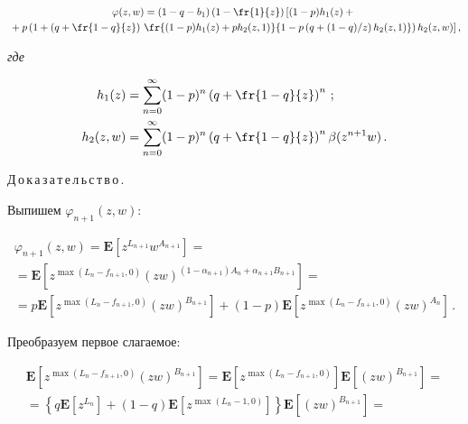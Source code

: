 \begin{multline*}

\varphi(z,w)=(1-q-b_1)\left(1-\fr{1}{z}\right)

\left[\vphantom{\fr{(1-p)h_1(z)+ph_2(z,1)}{1-p\left(q+(1-q)/z\right)h_2(z,1)}}

(1-p)h_1(z)+{}\right.\\

\left.{}+p\left(

1+\left(q+\fr{1-q}{z}\right)\,

\fr{(1-p)h_1(z)+ph_2(z,1)}{1-p\left(q+(1-q)/z\right)h_2(z,1)}\right)h_2(z,w)\right],

\end{multline*}

\textit{где}

\begin{align*}

h_1(z)&=\sum\limits_{n=0}^{\infty}(1-p)^n\left(q+\fr{1-q}{z}\right)^n\,;\\

h_2(z,w)&=\sum\limits_{n=0}^{\infty}(1-p)^n\left(q+\fr{1-q}{z}\right)^n\beta(z^{n+1}w)\,.

\end{align*}



\noindent

Д\,о\,к\,а\,з\,а\,т\,е\,л\,ь\,с\,т\,в\,о\,.\ \

Выпишем $\varphi_{n+1}(z,w)$:

\begin{multline*}

\varphi_{n+1}(z,w)=\mathbf{E}\left[z^{L_{n+1}}w^{A_{n+1}}\right]={}\\

{}=\mathbf{E}\left[z^{\max(L_n-f_{n+1},0)}(zw)^{(1-\alpha_{n+1})A_n+\alpha_{n+1}B_{n+1}}\right]={}\\

=p\mathbf{E}\left[z^{\max(L_n-f_{n+1},0)}(zw)^{B_{n+1}}\right]+(1-p)\mathbf{E}\left[z^{\max(L_n-f_{n+1},0)}(zw)^{A_n}\right]\,.

\end{multline*}

Преобразуем первое слагаемое:

\begin{multline*}

\mathbf{E}\left[

z^{\max(L_n-f_{n+1},0)}(zw)^{B_{n+1}}\right]=

\mathbf{E}\left[z^{\max(L_n-f_{n+1},0)}\right]\mathbf{E}\left[(zw)^{B_{n+1}}\right]={}\\

{}=\left\{q\mathbf{E}\left[z^{L_n}\right]+(1-q)\mathbf{E}\left[z^{\max(L_n-1,0)}\right]

\right\}\mathbf{E}\left[(zw)^{B_{n+1}}\right]={}

\end{multline*}



